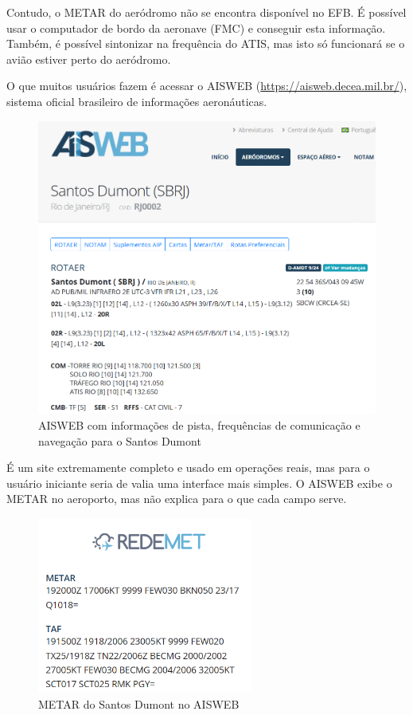 Contudo, o METAR do aeródromo não se encontra disponível no EFB. É possível usar
 o computador de bordo da aeronave (FMC) e conseguir esta informação. Também, é 
 possível sintonizar na frequência do ATIS, mas isto só funcionará se o avião
 estiver perto do aeródromo.

O que muitos usuários fazem é acessar o AISWEB 
(\url{https://aisweb.decea.mil.br/}), sistema oficial brasileiro de informações
aeronáuticas. 

\begin{figure}[ht]
    \begin{center}
    \includegraphics[width=350pt]{img/aisweb.png}
    \caption{AISWEB com informações de pista, frequências de comunicação e navegação para o Santos Dumont}
    \label{fig:aisweb}
    \end{center}
\end{figure}

É um site extremamente completo e usado em operações reais, mas para o usuário 
iniciante seria de valia uma interface mais simples. O AISWEB exibe o METAR no 
aeroporto, mas não explica para o que cada campo serve.

\begin{figure}[ht]
    \begin{center}
    \includegraphics[width=200pt]{img/metar-aisweb.png}
    \caption{METAR do Santos Dumont no AISWEB}
    \label{fig:aisweb}
    \end{center}
\end{figure}


